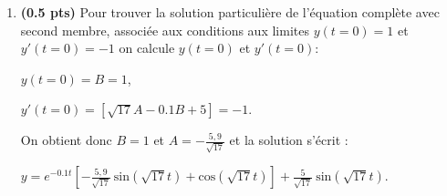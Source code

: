 \documentclass[fleqn]{article}
\begin{document}
\begin{enumerate}
\begin{center}
{$[- 17C -\frac{1}{5} \sqrt{17} D+17C]\ \text{sin}(\sqrt{17} t) + [-17 D+\frac{1}{5}\sqrt{17} C +17D]\ \text{cos}(\sqrt{17} t) = \text{cos}( \sqrt{17} t)$}
\end{center}

{Par identification des termes en $\text{sin}(\sqrt{17} t)$ et ceux en $\text{cos}(\sqrt{17} t)$ de part et d'autre de l'\'egalit\'e, on obtient :}

\begin{center}
{$D=0$ et $C=\frac{5}{\sqrt{17}}$.}
\end{center}

{Soit une solution particuli\`ere de l'\'equation avec second membre \'egale \`a:}

\begin{center}
{$y= \frac{5}{\sqrt{17}}\ \text{sin}(\sqrt{17} t)$,}
\end{center}

{et une solution g\'en\'erale de l'\'equation compl\`ete avec second membre :}

\begin{center}
{$y= e^{- 0.1t} [A\  \text{sin}(\sqrt{17} t) + B\  \text{cos}(\sqrt{17} t)] + \frac{5}{\sqrt{17}}\ \text{sin}(\sqrt{17} t)$, A et B \'etant deux r\'eels}
\end{center}


\item \textbf{(0.5 pts)} {Pour trouver la solution particuli\`ere de l'\'equation compl\`ete avec second membre, associ\'ee aux conditions aux limites $y(t=0)=1$ et $y'(t=0)=-1$ on calcule $y(t=0)$ et $y'(t=0)$:}

\begin{center}
{$y(t=0)= B=1$, }

{$y'(t=0)= [\sqrt{17}A - 0.1 B + 5]=-1$.}
\end{center}

{On obtient donc $B=1$ et $A=-\frac{5,9}{\sqrt{17}}$ et la solution s'\'ecrit :}

\begin{center}
{$y= e^{- 0.1 t} [-\frac{5,9}{\sqrt{17}} \  \text{sin}(\sqrt{17} t) +  \text{cos}(\sqrt{17} t) ] + \frac{5}{\sqrt{17}}\ \text{sin}(\sqrt{17} t)$.}
\end{center}
\end{enumerate}
\end{document}
